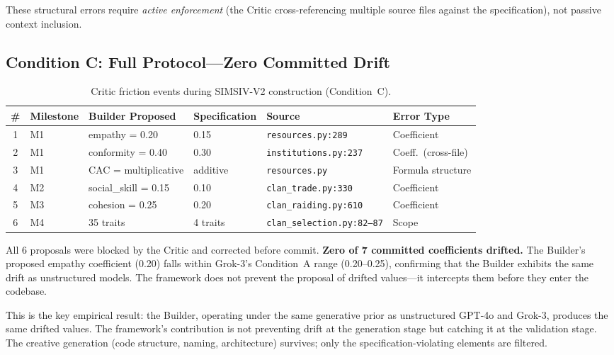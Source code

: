 \documentclass[11pt,a4paper]{article}
\begin{document}
These structural errors require \textit{active enforcement} (the Critic cross-referencing multiple source files against the specification), not passive context inclusion.

\subsection{Condition C: Full Protocol---Zero Committed Drift}

\begin{table}[ht]
\centering
\caption{Critic friction events during SIMSIV-V2 construction (Condition~C).}
\label{tab:friction}
\begin{tabular}{@{}clllll@{}}
\toprule
\# & Milestone & Builder Proposed & Specification & Source & Error Type \\
\midrule
1 & M1 & empathy = 0.20 & 0.15 & \texttt{resources.py:289} & Coefficient \\
2 & M1 & conformity = 0.40 & 0.30 & \texttt{institutions.py:237} & Coeff.\ (cross-file) \\
3 & M1 & CAC = multiplicative & additive & \texttt{resources.py} & Formula structure \\
4 & M2 & social\_skill = 0.15 & 0.10 & \texttt{clan\_trade.py:330} & Coefficient \\
5 & M3 & cohesion = 0.25 & 0.20 & \texttt{clan\_raiding.py:610} & Coefficient \\
6 & M4 & 35 traits & 4 traits & \texttt{clan\_selection.py:82--87} & Scope \\
\bottomrule
\end{tabular}
\end{table}

All 6 proposals were blocked by the Critic and corrected before commit. \textbf{Zero of 7 committed coefficients drifted.} The Builder's proposed empathy coefficient (0.20) falls within Grok-3's Condition~A range (0.20--0.25), confirming that the Builder exhibits the same drift as unstructured models. The framework does not prevent the proposal of drifted values---it intercepts them before they enter the codebase.

This is the key empirical result: the Builder, operating under the same generative prior as unstructured GPT-4o and Grok-3, produces the same drifted values. The framework's contribution is not preventing drift at the generation stage but catching it at the validation stage. The creative generation (code structure, naming, architecture) survives; only the specification-violating elements are filtered.
\end{document}
